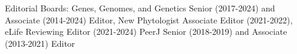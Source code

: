\documentclass[letterpaper,10pt]{article}
\newcommand{\ignore}[1]{}
\renewenvironment{itemize}{
  \begin{list}{}{
    \setlength{\leftmargin}{1.5em}
  }
}{
  \end{list}
}
\begin{document}
\begin{itemize}
\item Editorial Boards:
Genes, Genomes, and Genetics Senior (2017-2024) and Associate (2014-2024) Editor, %
New Phytologist Associate Editor (2021-2022),  %
eLife Reviewing Editor (2021-2024)
PeerJ Senior (2018-2019) and Associate (2013-2021) Editor

\end{itemize}
\end{document}
